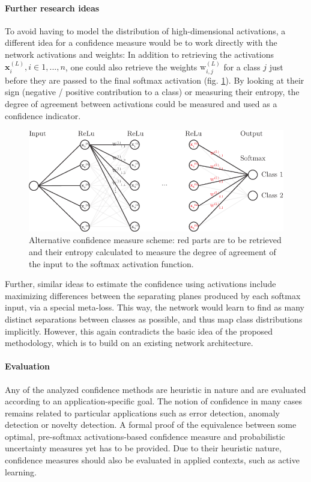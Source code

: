 \documentclass[10pt]{article}
\begin{document}
\paragraph{Further research ideas} To avoid having to model the distribution of high-dimensional activations, a different idea for a confidence measure would be to work directly with the network activations and weights: In addition to retrieving the activations $\mathbf{x}^{(L)}_i, i \in 1, ..., n$, one could also retrieve the weights $\text{w}^{(L)}_{i, j}$ for a class $j$ just before they are passed to the final softmax activation (fig. \ref{fig:nn_scheme}). By looking at their sign (negative / positive contribution to a class) or measuring their entropy, the degree of agreement between activations could be measured and used as a confidence indicator.
\begin{figure}[H]
	\centering
	\includegraphics[width=.7\textwidth]{Schema/nn_scheme}
	\caption{Alternative confidence measure scheme: red parts are to be retrieved and their entropy calculated to measure the degree of agreement of the input to the softmax activation function.}
	\label{fig:nn_scheme}
\end{figure}

Further, similar ideas to estimate the confidence using activations include maximizing differences between the separating planes produced by each softmax input, via a special meta-loss. This way, the network would learn to find as many distinct separations between classes as possible, and thus map class distributions implicitly. However, this again contradicts the basic idea of the proposed methodology, which is to build on an existing network architecture.

\paragraph{Evaluation} Any of the analyzed confidence methods are heuristic in nature and are evaluated according to an application-specific goal. The notion of confidence in many cases remains related to particular applications such as error detection, anomaly detection or novelty detection. A formal proof of the equivalence between some optimal, pre-softmax activations-based confidence measure and probabilistic uncertainty measures yet has to be provided. Due to their heuristic nature, confidence measures should also be evaluated in applied contexts, such as active learning.
\end{document}
